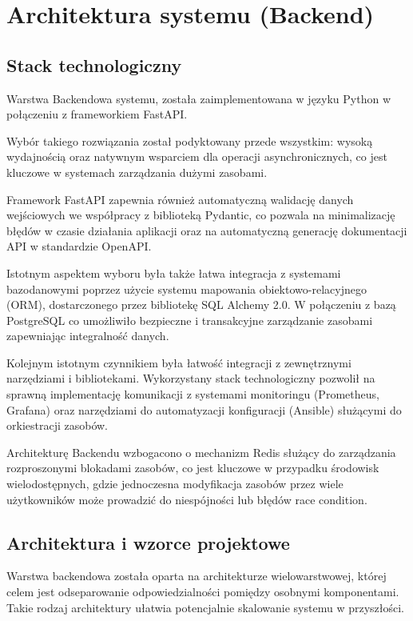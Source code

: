 \chapter{Architektura systemu (Backend)}

\section{Stack technologiczny}
\par Warstwa \gls{Backend}owa systemu, została zaimplementowana w języku Python w połączeniu z frameworkiem \gls{FastAPI}. 
\par Wybór takiego rozwiązania został podyktowany przede wszystkim: wysoką wydajnością oraz natywnym wsparciem dla operacji asynchronicznych, co jest kluczowe w systemach zarządzania dużymi zasobami. 
\par Framework \gls{FastAPI} zapewnia również automatyczną walidację danych wejściowych we współpracy z biblioteką \gls{Pydantic}, co pozwala na minimalizację błędów w czasie działania aplikacji oraz na automatyczną generację dokumentacji \gls{API} w standardzie \gls{OpenAPI}.
\par Istotnym aspektem wyboru była także łatwa integracja z systemami bazodanowymi poprzez użycie systemu mapowania obiektowo-relacyjnego (\gls{ORM}), dostarczonego przez bibliotekę \gls{SQL Alchemy} 2.0. W połączeniu z bazą \gls{PostgreSQL} co umożliwiło bezpieczne i transakcyjne zarządzanie zasobami zapewniając integralność danych.
\par Kolejnym istotnym czynnikiem była łatwość integracji z zewnętrznymi narzędziami i bibliotekami. Wykorzystany stack technologiczny pozwolił na sprawną implementację komunikacji z systemami monitoringu (\gls{Prometheus}, \gls{Grafana}) oraz narzędziami do automatyzacji konfiguracji (\gls{Ansible}) służącymi do orkiestracji zasobów.
\par Architekturę \gls{Backend}u wzbogacono o mechanizm \gls{Redis} służący do zarządzania rozproszonymi blokadami zasobów, co jest kluczowe w przypadku środowisk wielodostępnych, gdzie jednoczesna modyfikacja zasobów przez wiele użytkowników może prowadzić do niespójności lub błędów \gls{race condition}.

\section{Architektura i wzorce projektowe}
\par Warstwa backendowa została oparta na architekturze wielowarstwowej, której celem jest odseparowanie odpowiedzialności pomiędzy osobnymi komponentami. Takie rodzaj architektury ułatwia potencjalnie skalowanie systemu w przyszłości.

